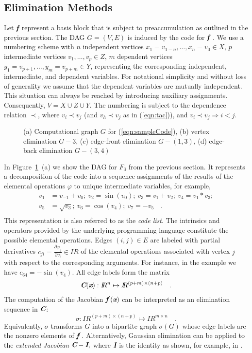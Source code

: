 \documentclass[acmtocl,acmnow]{acmtrans2m}
\newcommand{\R}{I\!\!R}
\newcommand{\bmC}{\mbox{\bf\em C}}
\newcommand{\bmf}{\mbox{\bf\em f}}
\newcommand{\bmI}{\mbox{\bf\em I}}
\newcommand{\bmx}{\mbox{\bf\em x}}
\newcommand{\reffig}[1]{Figure~\ref{#1}}
\newcommand{\refeqn}[1]{(\ref{#1})}
\begin{document}
\subsection{Elimination Methods} \label{ssec:tools}
Let $\bmf$ represent a basis block that is subject to preaccumulation
as outlined in the previous section.
The DAG  $G=(V,E)$ is induced by the code for $\bmf$ \cite{ASU86}.
We use a numbering scheme with $n$ independent vertices 
$x_1=v_{1-n},\ldots,x_n=v_0 \in X$, 
$p$ intermediate vertices 
$v_1,\ldots,v_p \in Z$,  
$m$ dependent vertices 
$y_1=v_{p+1},\ldots,y_m=v_{p+m} \in Y$, 
representing the corresponding independent, intermediate, and dependent 
variables.
For notational simplicity and without loss of generality we assume that the 
dependent variables are mutually independent. This situation can always be
reached by introducing auxiliary assignments.
Consequently, $V=X\cup Z \cup Y$. 
The numbering is subject to the dependence relation 
$\prec$, where $v_i \prec v_j$ (and 
$v_h \prec v_j$ as in \refeqn{eqn:tac}), and
$ v_i \prec v_j \Rightarrow i<j.$
\begin{figure}[ht]
\centering{}
\caption{
(a) Computational graph $G$ for \refeqn{eqn:sampleCode}, 
(b) vertex elimination $G-3$, 
(c) edge-front elimination $G-(1,3)$, 
(d) edge-back elimination $G-(3,4)$} 
\label{fig:elims}
\end{figure}
In \reffig{fig:elims}~(a) we show the DAG for $F_3$ from the previous section. 
It represents a decomposition of the code into a sequence assignments of
the results of the elemental operations $\varphi$ to unique intermediate 
variables,
for example,
\begin{equation}\label{eqn:sampleCode}
\begin{split}
 v_1&=v_{-1}+v_0;~v_2=\sin(v_0);~v_3=v_1+v_2;~v_4=v_1*v_3; \\
v_5&=\sqrt{v_3};~v_6=\cos(v_4);~v_7=-v_5 \quad .\\
\end{split}
\end{equation}
This representation is also referred to as the {\em code list}.
The intrinsics and operators provided by the underlying programming language 
constitute the possible elemental operations.
Edges $(i,j)\in E$ are labeled with partial derivatives
$c_{ji}=\frac{\partial \varphi_j}{\partial v_i} \in \R$ of the elemental operations
associated with vertex $j$ with respect to the corresponding arguments. 
For instance, in the 
example we have $c_{64}=-\sin(v_4)$.
All edge labels form the matrix
\[ 
\bmC(\bmx):\R^n\mapsto \R^{(p+m)\times(n+p)}\quad .
\]
The computation of the 
Jacobian $\bmf'(\bmx)$
can be interpreted 
as an elimination sequence in $\bmC$:
\[
\sigma: \R^{(p+m)\times(n+p)} \mapsto \R^{m\times n}\quad .
\]
Equivalently, $\sigma$ transforms $G$ into a bipartite graph $\sigma(G)$ whose 
edge labels are the nonzero elements of $\bmf'$. Alternatively,
Gaussian elimination can be applied to the {\em extended Jacobian} 
$\bmC - \bmI,$ where $\bmI$ is the identity as shown, for example, in 
\cite{Gri00}.
\end{document}
